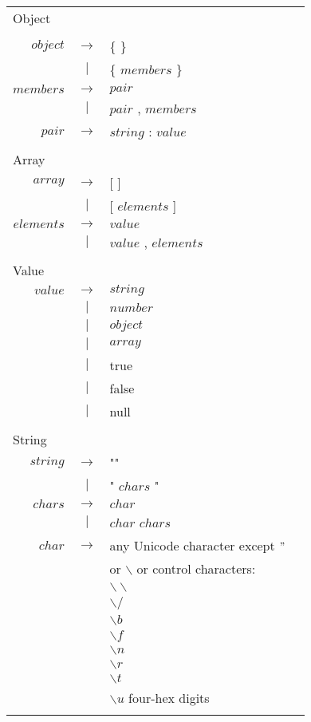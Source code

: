 \begin{footnotesize}
\begin{longtable}{ r c l r }

\multicolumn{4}{l}{Object}		\\
\\[0.01in]
$object$	& $ \rightarrow $ 	& \{ \}					& \\
 		& $ | $			& \{ $members$ \} 			& \\
$members$ 	& $ \rightarrow $	& $pair$				& \\
		& $ | $			& $pair$ , $members$ 			& \\
$pair$		& $ \rightarrow $	& $string$ : $value$ 			& \\
\\[0.01in]

\multicolumn{4}{l}{Array}		\\
$array$		& $ \rightarrow $	& [ ]					& \\
		& $ | $			& [ $elements$ ]			& \\
$elements$ 	& $ \rightarrow $	& $value$				& \\
		& $ | $			& $value$ , $elements$			& \\
\\[0.01in]

\multicolumn{4}{l}{Value}		\\
$value$		& $ \rightarrow $	& $string$				& \\
		& $ | $			& $number$				& \\
		& $ | $			& $object$				& \\
		& $ | $			& $array$				& \\
		& $ | $			& true					& \\
		& $ | $			& false					& \\
		& $ | $			& null					& \\
\\[0.01in]

\multicolumn{4}{l}{String}		\\
$string$	& $ \rightarrow $	& ""					& \\
		& $ | $			& " $chars$ "				& \\
$chars$		& $ \rightarrow $	& $char$				& \\
		& $ | $			& $char$ $chars$			& \\
$char$		& $ \rightarrow $	& any Unicode character except $"$ 	& \\ 
		&			& or $\backslash$ or control characters: & \\
		&			& $\backslash\backslash$		& \\
		&			& $\backslash /$ 			& \\
		&			& $\backslash b$ 			& \\
		& 			& $\backslash f$ 			& \\
		&			& $\backslash n$			& \\
		& 			& $\backslash r$ 			& \\
		&			& $\backslash t$ 			& \\
		& 			& $\backslash u$ four-hex digits\\
\\[0.01in]


\end{longtable}
\end{footnotesize}
